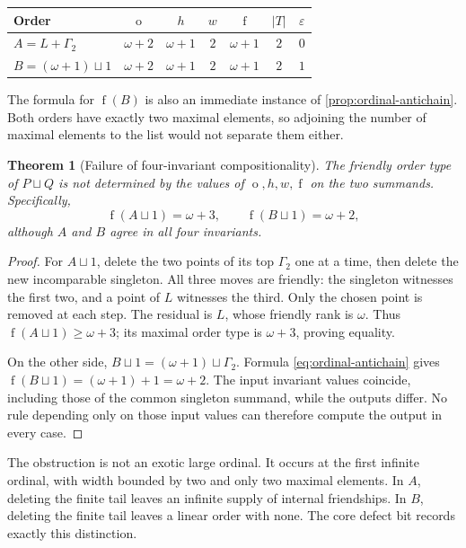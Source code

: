 \documentclass[11pt,a4paper]{article}
\newtheorem{theorem}{Theorem}[section]
\theoremstyle{definition}
\theoremstyle{remark}
\DeclareMathOperator{\mot}{o}
\DeclareMathOperator{\fot}{f}
\newcommand{\ds}{\mathbin{\sqcup}}
\newcommand{\eps}{\varepsilon}
\begin{document}
\begin{center}
\renewcommand{\arraystretch}{1.18}
\begin{tabular}{@{}lcccccc@{}}
\toprule
Order & $\mot$ & $h$ & $w$ & $\fot$ & $|T|$ & $\eps$\\
\midrule
$A=L+\Gamma_2$ & $\omega+2$ & $\omega+1$ & $2$ & $\omega+1$ & $2$ & $0$\\
$B=(\omega+1)\ds1$ & $\omega+2$ & $\omega+1$ & $2$ & $\omega+1$ & $2$ & $1$\\
\bottomrule
\end{tabular}
\end{center}

The formula for $\fot(B)$ is also an immediate instance of
\cref{prop:ordinal-antichain}. Both orders have exactly two maximal elements,
so adjoining the number of maximal elements to the list would not separate
them either.

\begin{theorem}[Failure of four-invariant compositionality]\label{thm:nonfunctional}
The friendly order type of $P\ds Q$ is not determined by the values of
$\mot,h,w,\fot$ on the two summands. Specifically,
\begin{equation}\label{eq:nonfunctional}
\fot(A\ds1)=\omega+3,\qquad
\fot(B\ds1)=\omega+2,
\end{equation}
although $A$ and $B$ agree in all four invariants.
\end{theorem}
\begin{proof}
For $A\ds1$, delete the two points of its top $\Gamma_2$ one at a time,
then delete the new incomparable singleton. All three moves are friendly:
the singleton witnesses the first two, and a point of $L$ witnesses the
third. Only the chosen point is removed at each step. The residual is $L$,
whose friendly rank is $\omega$. Thus $\fot(A\ds1)\geq\omega+3$; its
maximal order type is $\omega+3$, proving equality.

On the other side, $B\ds1=(\omega+1)\ds\Gamma_2$. Formula
\eqref{eq:ordinal-antichain} gives $\fot(B\ds1)=(\omega+1)+1=\omega+2$.
The input invariant values coincide, including those of the common
singleton summand, while the outputs differ. No rule depending only on
those input values can therefore compute the output in every case.
\end{proof}

The obstruction is not an exotic large ordinal. It occurs at the first
infinite ordinal, with width bounded by two and only two maximal elements.
In $A$, deleting the finite tail leaves an infinite supply of internal
friendships. In $B$, deleting the finite tail leaves a linear order with
none. The core defect bit records exactly this distinction.
\end{document}
